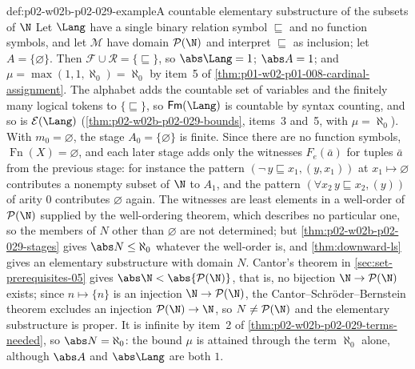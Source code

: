 \begin{hbexample}{def:p02-w02b-p02-029-example}{A countable elementary substructure of the subsets of \(\N\)}
Let \(\Lang\) have a single binary relation symbol \(\sqsubseteq\) and no
function symbols, and let \(\mathcal M\) have domain \(\mathcal P(\N)\) and
interpret \(\sqsubseteq\) as inclusion; let \(A=\{\varnothing\}\). Then
\(\mathcal F\cup\mathcal R=\{\sqsubseteq\}\), so \(\abs\Lang=1\);
\(\abs A=1\); and \(\mu=\max(1,1,\aleph_0)=\aleph_0\) by item~5 of
\cref{thm:p01-w02-p01-008-cardinal-assignment}. The alphabet adds the
countable set of variables and the finitely many logical tokens to
\(\{\sqsubseteq\}\), so \(\mathsf{Fm}(\Lang)\) is countable by syntax
counting, and so is \(\mathcal E(\Lang)\)
(\cref{thm:p02-w02b-p02-029-bounds}, items~3 and~5, with \(\mu=\aleph_0\)).
With \(m_0=\varnothing\), the stage \(A_0=\{\varnothing\}\) is finite. Since
there are no function symbols, \(\operatorname{Fn}(X)=\varnothing\), and
each later stage adds only the witnesses \(F_e(\bar a)\) for tuples
\(\bar a\) from the previous stage: for instance the pattern
\((\neg\,y\sqsubseteq x_1,(y,x_1))\) at \(x_1\mapsto\varnothing\) contributes
a nonempty subset of \(\N\) to \(A_1\), and the pattern
\((\forall x_2\,y\sqsubseteq x_2,(y))\) of arity \(0\) contributes
\(\varnothing\) again. The witnesses are least elements in a well-order of
\(\mathcal P(\N)\) supplied by the well-ordering theorem, which describes no
particular one, so the members of \(N\) other than \(\varnothing\) are not
determined; but \cref{thm:p02-w02b-p02-029-stages} gives
\(\abs N\leq\aleph_0\) whatever the well-order is, and \cref{thm:downward-ls}
gives an elementary substructure with domain \(N\). Cantor's theorem in
\cref{sec:set-prerequisites-05} gives \(\abs\N<\abs{\mathcal P(\N)}\), that
is, no bijection \(\N\to\mathcal P(\N)\) exists; since
\(n\mapsto\{n\}\) is an injection \(\N\to\mathcal P(\N)\), the
Cantor--Schr\"oder--Bernstein theorem excludes an injection
\(\mathcal P(\N)\to\N\), so \(N\neq\mathcal P(\N)\) and the elementary
substructure is proper. It is infinite by item~2 of
\cref{thm:p02-w02b-p02-029-terms-needed}, so \(\abs N=\aleph_0\): the bound
\(\mu\) is attained through the term \(\aleph_0\) alone, although \(\abs A\)
and \(\abs\Lang\) are both \(1\).
\end{hbexample}


